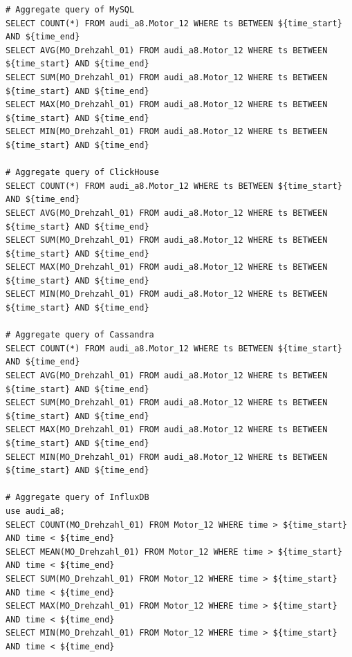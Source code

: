 \begin{verbatim}
# Aggregate query of MySQL 
SELECT COUNT(*) FROM audi_a8.Motor_12 WHERE ts BETWEEN ${time_start} AND ${time_end}
SELECT AVG(MO_Drehzahl_01) FROM audi_a8.Motor_12 WHERE ts BETWEEN ${time_start} AND ${time_end}
SELECT SUM(MO_Drehzahl_01) FROM audi_a8.Motor_12 WHERE ts BETWEEN ${time_start} AND ${time_end}
SELECT MAX(MO_Drehzahl_01) FROM audi_a8.Motor_12 WHERE ts BETWEEN ${time_start} AND ${time_end}
SELECT MIN(MO_Drehzahl_01) FROM audi_a8.Motor_12 WHERE ts BETWEEN ${time_start} AND ${time_end}

# Aggregate query of ClickHouse
SELECT COUNT(*) FROM audi_a8.Motor_12 WHERE ts BETWEEN ${time_start} AND ${time_end}
SELECT AVG(MO_Drehzahl_01) FROM audi_a8.Motor_12 WHERE ts BETWEEN ${time_start} AND ${time_end}
SELECT SUM(MO_Drehzahl_01) FROM audi_a8.Motor_12 WHERE ts BETWEEN ${time_start} AND ${time_end}
SELECT MAX(MO_Drehzahl_01) FROM audi_a8.Motor_12 WHERE ts BETWEEN ${time_start} AND ${time_end}
SELECT MIN(MO_Drehzahl_01) FROM audi_a8.Motor_12 WHERE ts BETWEEN ${time_start} AND ${time_end}

# Aggregate query of Cassandra
SELECT COUNT(*) FROM audi_a8.Motor_12 WHERE ts BETWEEN ${time_start} AND ${time_end}
SELECT AVG(MO_Drehzahl_01) FROM audi_a8.Motor_12 WHERE ts BETWEEN ${time_start} AND ${time_end}
SELECT SUM(MO_Drehzahl_01) FROM audi_a8.Motor_12 WHERE ts BETWEEN ${time_start} AND ${time_end}
SELECT MAX(MO_Drehzahl_01) FROM audi_a8.Motor_12 WHERE ts BETWEEN ${time_start} AND ${time_end}
SELECT MIN(MO_Drehzahl_01) FROM audi_a8.Motor_12 WHERE ts BETWEEN ${time_start} AND ${time_end}

# Aggregate query of InfluxDB
use audi_a8;
SELECT COUNT(MO_Drehzahl_01) FROM Motor_12 WHERE time > ${time_start} AND time < ${time_end} 
SELECT MEAN(MO_Drehzahl_01) FROM Motor_12 WHERE time > ${time_start} AND time < ${time_end} 
SELECT SUM(MO_Drehzahl_01) FROM Motor_12 WHERE time > ${time_start} AND time < ${time_end} 
SELECT MAX(MO_Drehzahl_01) FROM Motor_12 WHERE time > ${time_start} AND time < ${time_end} 
SELECT MIN(MO_Drehzahl_01) FROM Motor_12 WHERE time > ${time_start} AND time < ${time_end} 
\end{verbatim}

\label{lst: aggregate}


